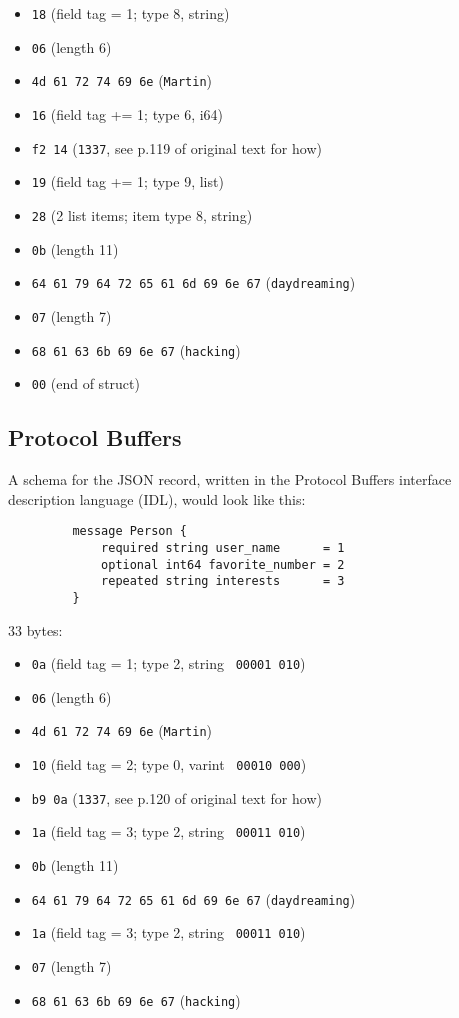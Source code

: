 \documentclass[12pt, titlepage]{article}
\begin{document}
\begin{itemize}
    \item \texttt{18} (field tag = 1; type 8, string)
    \item \texttt{06} (length 6)
    \item \texttt{4d 61 72 74 69 6e} (\texttt{Martin})
    \item \texttt{16} (field tag += 1; type 6, i64)
    \item \texttt{f2 14} (\texttt{1337}, see p.119 of original text for how)
    \item \texttt{19} (field tag += 1; type 9, list)
    \item \texttt{28} (2 list items; item type 8, string)
    \item \texttt{0b} (length 11)
    \item \texttt{64 61 79 64 72 65 61 6d 69 6e 67} (\texttt{daydreaming})
    \item \texttt{07} (length 7)
    \item \texttt{68 61 63 6b 69 6e 67} (\texttt{hacking})
    \item \texttt{00} (end of struct)
\end{itemize}

\subsection{Protocol Buffers}

A schema for the JSON record, written in the Protocol Buffers interface description language (IDL), would look like this:

\begin{verbatim}
         message Person {
             required string user_name      = 1
             optional int64 favorite_number = 2
             repeated string interests      = 3
         }
\end{verbatim}

33 bytes:

\begin{itemize}
    \item \texttt{0a} (field tag = 1; type 2, string \textrightarrow\ \texttt{00001 010})
    \item \texttt{06} (length 6)
    \item \texttt{4d 61 72 74 69 6e} (\texttt{Martin})
    \item \texttt{10} (field tag = 2; type 0, varint \textrightarrow\ \texttt{00010 000})
    \item \texttt{b9 0a} (\texttt{1337}, see p.120 of original text for how)
    \item \texttt{1a} (field tag = 3; type 2, string \textrightarrow\ \texttt{00011 010})
    \item \texttt{0b} (length 11)
    \item \texttt{64 61 79 64 72 65 61 6d 69 6e 67} (\texttt{daydreaming})
    \item \texttt{1a} (field tag = 3; type 2, string \textrightarrow\ \texttt{00011 010})
    \item \texttt{07} (length 7)
    \item \texttt{68 61 63 6b 69 6e 67} (\texttt{hacking})
\end{itemize}
\end{document}
